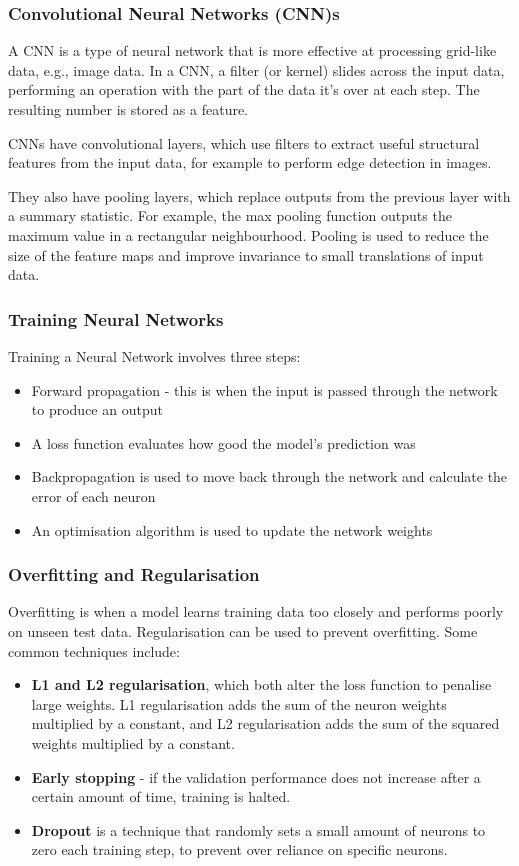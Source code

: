 \documentclass[ oneside,%
                    author={Jack Jarvis},
                    degree={BSc},
                     title={FlexIR: Flexible PCB Wristbands for Infrared Based Gesture Recognition},
                    unit={COMS30045},
                    subtitle={Investigating the Effect of LED Viewing Angle on Gesture Classification in Infrared Sensing Systems}]{dissertation}
\begin{document}
\subsubsection{Convolutional Neural Networks (CNN)s}
A CNN \cite{Goodfellow-et-al-2016} is a type of neural network that is more effective at processing grid-like data, e.g., image data. In a CNN, a filter (or kernel) slides across the input data, performing an operation with the part of the data it's over at each step. The resulting number is stored as a feature.

CNNs have convolutional layers, which use filters to extract useful structural features from the input data, for example to perform edge detection in images.

They also have pooling layers, which replace outputs from the previous layer with a summary statistic. For example, the max pooling function outputs the maximum value in a rectangular neighbourhood. Pooling is used to reduce the size of the feature maps and improve invariance to small translations of input data.

\subsubsection{Training Neural Networks}
Training a Neural Network involves three steps:
\begin{itemize}
    \item Forward propagation - this is when the input is passed through the network to produce an output
    \item A loss function evaluates how good the model's prediction was
    \item Backpropagation is used to move back through the network and calculate the error of each neuron
    \item An optimisation algorithm is used to update the network weights
\end{itemize}

\subsubsection{Overfitting and Regularisation}
Overfitting is when a model learns training data too closely and performs poorly on unseen test data. Regularisation can be used to prevent overfitting. Some common techniques include:
\begin{itemize}
    \item \textbf{L1 and L2 regularisation}, which both alter the loss function to penalise large weights. L1 regularisation adds the sum of the neuron weights multiplied by a constant, and L2 regularisation adds the sum of the squared weights multiplied by a constant.
    \item \textbf{Early stopping} - if the validation performance does not increase after a certain amount of time, training is halted.
    \item \textbf{Dropout} is a technique that randomly sets a small amount of neurons to zero each training step, to prevent over reliance on specific neurons.

\end{itemize}
\end{document}
